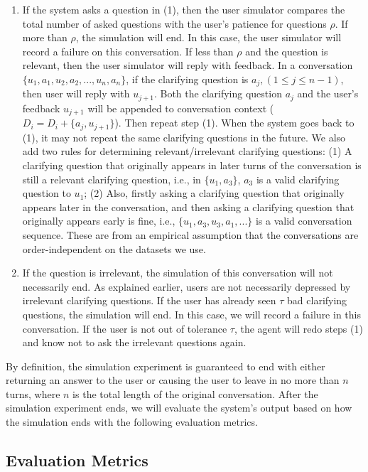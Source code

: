 \documentclass[format=acmsmall, review=False, screen=true]{acmart}
\begin{document}
\begin{enumerate}
        \item If the system asks a question in (1), then the user simulator compares the total number of asked questions with the user's patience for questions $\rho$. If more than $\rho$, the simulation will end. In this case, the user simulator will record a failure on this conversation. If less than $\rho$ and the question is relevant, then the user simulator will reply with feedback. In a conversation $\{u_1,a_1,u_2,a_2, ...,u_n,a_n\}$, if the clarifying question is $a_j,(1\leq j\leq n-1)$, then user will reply with $u_{j+1}$. Both the clarifying question $a_j$ and the user's feedback $u_{j+1}$ will be appended to conversation context ($D_i=D_i + \{a_j,u_{j+1}\}$). Then repeat step (1). When the system goes back to (1), it may not repeat the same clarifying questions in the future. We also add two rules for determining relevant/irrelevant clarifying questions: (1) A clarifying question that originally appears in later turns of the conversation is still a relevant clarifying question, i.e., in $\{u_1, a_3\}$, $a_3$ is a valid clarifying question to $u_1$; (2) Also, firstly asking a clarifying question that originally appears later in the conversation, and then asking a clarifying question that originally appears early is fine, i.e., $\{u_1, a_3, u_3, a_1,...\}$ is a valid conversation sequence. These are from an empirical assumption that the conversations are order-independent on the datasets we use. 
        
        \item If the question is irrelevant, the simulation of this conversation will not necessarily end. As explained earlier, users are not necessarily depressed by irrelevant clarifying questions. If the user has already seen $\tau$ bad clarifying questions, the simulation will end. In this case, we will record a failure in this conversation. If the user is not out of tolerance $\tau$, the agent will redo steps (1) and know not to ask the irrelevant questions again. 
\end{enumerate}

By definition, the simulation experiment is guaranteed to end with either returning an answer to the user or causing the user to leave in no more than $n$ turns, where $n$ is the total length of the original conversation. After the simulation experiment ends, we will evaluate the system's output based on how the simulation ends with the following evaluation metrics.

\subsection{Evaluation Metrics}
\end{document}
